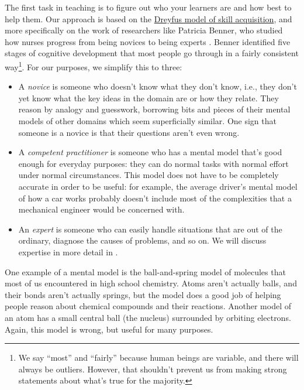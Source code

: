 
The first task in teaching is to figure out who your learners are and
how best to help them.  Our approach is based on the
\href{https://en.wikipedia.org/wiki/Dreyfus\_model\_of\_skill\_acquisition}{Dreyfus
model of skill acquisition}, and more specifically on the work of
researchers like Patricia Benner, who studied how nurses progress from
being novices to being experts \cite{benner}.  Benner identified five
stages of cognitive development that most people go through in a
fairly consistent way\footnote{We say ``most'' and ``fairly'' because
human beings are variable, and there will always be outliers.
However, that shouldn't prevent us from making strong statements about
what's true for the majority.}. For our purposes, we simplify this to
three:

\begin{itemize}

\item
  A \emph{novice} is someone who doesn't know what they don't know,
  i.e., they don't yet know what the key ideas in the domain are or
  how they relate. They reason by analogy and guesswork, borrowing
  bits and pieces of their mental models of other domains which seem
  superficially similar. One sign that someone is a novice is that
  their questions aren't even wrong.

\item
  A \emph{competent practitioner} is someone who has a mental model
  that's good enough for everyday purposes: they can do normal tasks
  with normal effort under normal circumstances. This model does not
  have to be completely accurate in order to be useful: for example,
  the average driver's mental model of how a car works probably
  doesn't include most of the complexities that a mechanical engineer
  would be concerned with.

\item
  An \emph{expert} is someone who can easily handle situations that are
  out of the ordinary, diagnose the causes of problems, and so on. We
  will discuss expertise in more detail in .

\end{itemize}

One example of a mental model is the ball-and-spring model of
molecules that most of us encountered in high school chemistry. Atoms
aren't actually balls, and their bonds aren't actually springs, but
the model does a good job of helping people reason about chemical
compounds and their reactions.  Another model of an atom has a small
central ball (the nucleus) surrounded by orbiting electrons.  Again,
this model is wrong, but useful for many purposes.

